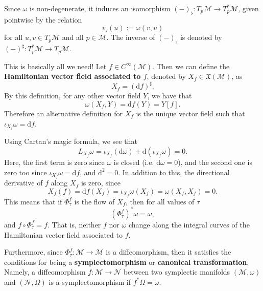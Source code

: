 \documentclass[11pt,a4]{article}
\newcommand{\de}{\mathrm{d}}
\begin{document}
Since
$\omega$ is non-degenerate, it induces an isomorphism $(-)_\flat:T_p\mathcal{M}\to T_p^*\mathcal{M}$, given
pointwise by the relation
\begin{equation}
  \label{eq:10}
  v_\flat(u):=\omega(v,u)
\end{equation}
for all $u,v\in T_p\mathcal{M}$ and all $p\in\mathcal{M}$. The inverse of $(-)_\flat$ is denoted
by $(-)^\sharp:T_p^*\mathcal{M}\to T_p\mathcal{M}$.

This is basically all we need! Let $f\in C^{\infty}(\mathcal{M})$. Then we can define the \textbf{Hamiltonian vector field associated to $f$}, denoted by $X_f\in\mathfrak{X}(\mathcal{M})$, as
\begin{equation}
  \label{eq:15}
  X_f = (\de f)^{\sharp}.
\end{equation}
By this definition, for any other vector field $Y$, we have that
\begin{equation}
  \label{eq:16}
  \omega(X_f,Y) = \de f(Y)= Y[f].
\end{equation}
Therefore an alternative definition for $X_f$ is the unique vector field such that $\iota_{X_f}\omega = \de f$.

Using Cartan's magic formula, we see that
\begin{equation}
  \label{eq:17}
  L_{X_f}\omega = \iota_{X_f}(\de\omega) + \de\left(\iota_{X_f}\omega\right) = 0.
\end{equation}
Here, the first term is zero since $\omega$ is closed (i.e. $\de\omega=0$), and the second one is zero too since $\iota_{X_f}\omega=\de f$, and $\de^2=0$. In addition to this, the directional derivative of $f$ along $X_f$ is zero, since
\begin{equation}
  \label{eq:19}
  X_f(f) = \de f(X_f) = \iota_{X_f}\omega(X_f)=\omega(X_f,X_f)=0.
\end{equation}
This means that if $\Phi^f_\tau$ is the flow of $X_f$, then
for all values of $\tau$
\begin{equation}
  \label{eq:18}
  \left(\Phi^f_{\tau}\right)^*\omega = \omega,
\end{equation}
and $f\circ\Phi^f_\tau = f$. That is, neither $f$ nor $\omega$ change along the integral curves of the Hamiltonian vector field associated to $f$.

Furthermore, since $\Phi^f_{\tau}:\mathcal{M}\to\mathcal{M}$ is a diffeomorphism, then it satisfies the conditions for being a \textbf{symplectomorphism} or \textbf{canonical transformation}. Namely, a diffeomorphism $f:\mathcal{M}\to\mathcal{N}$ between two symplectic manifolds $(\mathcal{M},\omega)$ and $(\mathcal{N},\Omega)$ is a symplectomorphism if $f^*\Omega=\omega$.
\end{document}
